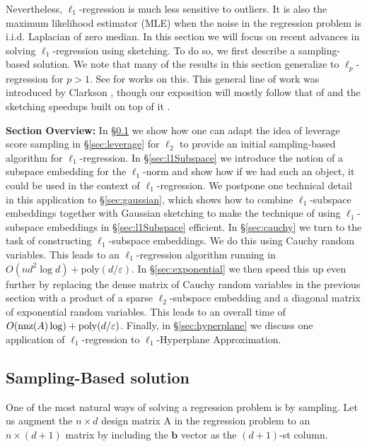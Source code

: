 \documentclass[11pt]{article}
\newcommand{\mat}[1]{{\ensuremath{\bm{\mathrm{#1}}}}}
\def\b{{\mathbf b}}
\def\matA{\mat{A}}
\def\nnz{{ \rm nnz }}
\def\b{{\mathbf b}}
\newcommand{\eps}{\varepsilon}
\newcommand{\poly}{{\mathrm{poly}}}
\begin{document}
Nevertheless, $\ell_1$-regression is much less sensitive to outliers. It is also the maximum
likelihood estimator (MLE) when the noise in the regression problem is i.i.d. Laplacian of
zero median. In this section we will focus on recent advances in solving $\ell_1$-regression
using sketching. To do so, we first describe a sampling-based solution. We note that many of the
results in this section generalize to $\ell_p$-regression for $p > 1$. See 
\cite{CW13,MM13,wz13} for works on this. This general line of work was introduced by
Clarkson \cite{Cla05}, though our exposition will mostly follow that of \cite{DDHKM09} and the
sketching speedups built on top of it \cite{sw11,CDMMMW13,MM13,wz13}. 

{\bf Section Overview:} In \S\ref{sec:sampling-Based} we show how one can adapt the idea of leverage score sampling in \S\ref{sec:leverage} for $\ell_2$ to provide an initial sampling-based algorithm for $\ell_1$-regression. In \S\ref{sec:l1Subspace} we introduce the notion of a subspace embedding for the $\ell_1$-norm and show how if we had such an object, it could be used in the context of $\ell_1$-regression. We postpone one technical detail in this application to \S\ref{sec:gaussian}, which shows how to combine $\ell_1$-subspace embeddings together with Gaussian sketching to make the technique of using $\ell_1$-subspace embeddings in \S\ref{sec:l1Subspace} efficient. In \S\ref{sec:cauchy} we turn to the task of constructing $\ell_1$-subspace embeddings. We do this using Cauchy random variables. This leads to an $\ell_1$-regression algorithm running in $O(nd^2\log d) + \poly(d/\eps)$. In \S\ref{sec:exponential} we then speed this up even further by replacing the dense matrix of Cauchy random variables in the previous section with a product of a sparse $\ell_2$-subspace embedding and a diagonal matrix of exponential random variables. This leads to an overall time of $O(\nnz(A) \log ) + \poly(d/\eps)$. Finally, in \S\ref{sec:hyperplane} we discuss one application of $\ell_1$-regression to $\ell_1$-Hyperplane Approximation. 

\subsection{Sampling-Based solution}\label{sec:sampling-Based}
One of the most natural ways of solving a regression problem is by sampling. Let us augment
the $n \times d$ design matrix $\matA$ in the regression problem to an $n \times (d+1)$ matrix
by including the $\b$ vector as the $(d+1)$-st column. 
\end{document}
